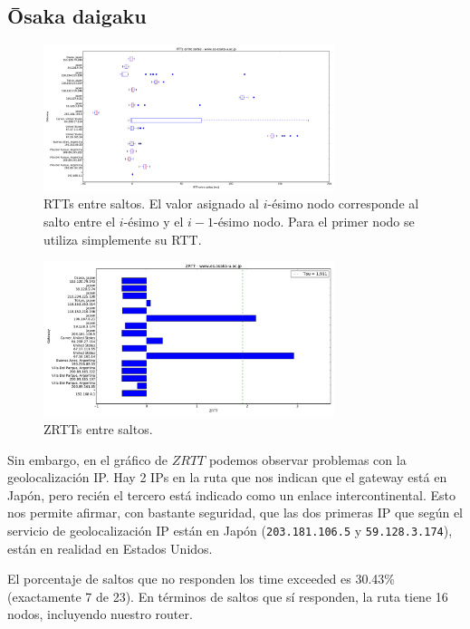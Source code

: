 \subsection{Ōsaka daigaku}


\begin{figure}[H]
    \centering
    \includegraphics[width=8.5cm]{img/grafico1-www-es-osaka-u-ac-jp.pdf}
    \caption{\normalfont RTTs entre saltos. El valor asignado al $i$-ésimo nodo corresponde al salto entre el $i$-ésimo y el $i - 1$-ésimo nodo. Para el primer nodo se utiliza simplemente su RTT.}
\end{figure}

\begin{figure}[H]
    \centering
    \includegraphics[width=8.5cm]{img/grafico2-www-es-osaka-u-ac-jp.pdf}
    \caption{\normalfont ZRTTs entre saltos.}
\end{figure}

Sin embargo, en el gráfico de $ZRTT$ podemos observar problemas con la geolocalización IP. Hay 2 IPs en la ruta que nos indican que el gateway está en Japón, pero recién el tercero está indicado como un enlace intercontinental.
Esto nos permite afirmar, con bastante seguridad, que las dos primeras IP que según el servicio de geolocalización IP están en Japón (\texttt{203.181.106.5} y \texttt{59.128.3.174}), están en realidad en Estados Unidos.

El porcentaje de saltos que no responden los time exceeded es 30.43\% (exactamente 7 de 23). En términos de saltos que sí responden, la ruta tiene 16 nodos, incluyendo nuestro router.

